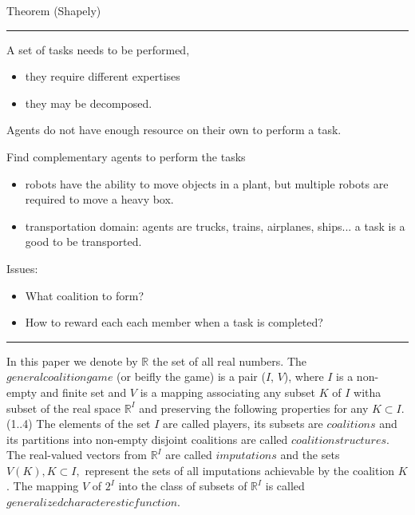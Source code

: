 \documentclass{article}
\begin{document}
Theorem (Shapely) 

\hrule 

A set of tasks needs to be performed,
\begin{itemize}
	\item they require different expertises
	\item they may be decomposed.
\end{itemize}

Agents do not have enough resource on their own to perform a task.

Find complementary agents to perform the tasks
\begin{itemize}
	\item robots have the ability to move objects in a plant, but multiple robots are required to move a heavy box.
	\item transportation domain: agents are trucks, trains, airplanes, ships... a task is a good to be transported.
\end{itemize}

Issues:
\begin{itemize}
	\item What coalition to form?
	\item How to reward each each member when a task is completed?
\end{itemize}

\hrule 

In this paper we denote by $\mathbb{R}$ the set of all real numbers. The $general coalition game$ (or beifly the game) is a pair ($I$, $V$),
where $I$ is a non-empty and finite set and $V$ is a mapping associating any subset $K$ of $I$ witha subset of the real space $\mathbb{R}^I$ and preserving the following properties for any $K \subset I$.
(1..4)
The elements of the set $I$ are called players, its subsets are $coalitions$ and its partitions into non-empty disjoint coalitions are called $coalition structures$. The real-valued vectors from $\mathbb{R}^I$ are called $imputations$ and the sets $V(K), K \subset I,$ represent the sets of all imputations achievable by the coalition $K$. The mapping $V$ of $2^I$ into the class of subsets of $\mathbb{R}^I$ is called $generalized characterestic function$. 
\end{document}
